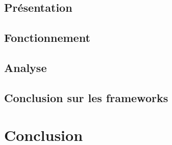 \documentclass[smallextended]{svjour3}       %
\begin{document}
\subsection{Présentation}
\label{frameworks:présentation}

\subsection{Fonctionnement}
\label{frameworks:fonctionnement}

\subsection{Analyse}
\label{frameworks:analyse}

\subsection{Conclusion sur les frameworks}
\label{frameworks:conclusion}


\newpage
\section{Conclusion}
\label{sec4:conclusion}


\end{document}

